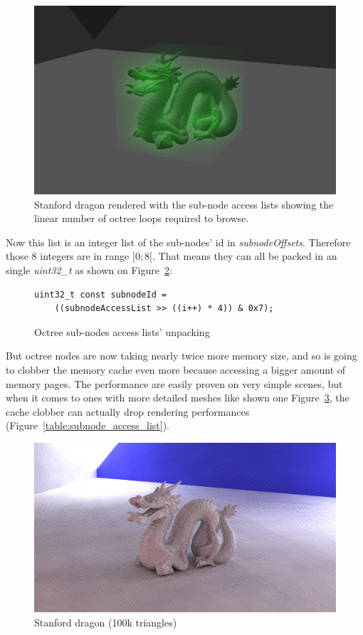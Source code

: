 \begin{figure}[h]
    \centering
    \includegraphics[width=0.8\columnwidth]{stats_octree_loops_optimized.png}
    \caption{
        Stanford dragon rendered with the sub-node access lists showing
        the linear number of octree loops required to browse.
    }
    \label{fig:stanford_dragon_with_access_list}
\end{figure}

Now this list is an integer list of the sub-nodes' id in
\textit{subnodeOffsets}. Therefore those 8 integers are in range $[0;8[$. That
means they can all be packed in an single \textit{uint32\_t} as shown on
Figure~\ref{code:subnode_access_unpacking}:

\begin{figure}[H]
    \centering
    \begin{lstlisting}[morekeywords={uint32_t}]
uint32_t const subnodeId =
    ((subnodeAccessList >> ((i++) * 4)) & 0x7);
    \end{lstlisting}
    \caption{Octree sub-nodes access lists' unpacking}
    \label{code:subnode_access_unpacking}
\end{figure}

But octree nodes are now taking nearly twice more memory size, and so is going
to clobber the memory cache even more because accessing a bigger amount of
memory pages. The performance are easily proven on very simple scenes, but when it comes
to ones with more detailed meshes like shown one Figure~\ref{fig:stanford_dragon}, the cache
clobber can actually drop rendering performances (Figure~\ref{table:subnode_access_list}).

\begin{figure}[h]
    \centering
    \includegraphics[width=0.8\columnwidth]{render_stanford_dragon.png}
    \caption{Stanford dragon (100k triangles)}
    \label{fig:stanford_dragon}
\end{figure}

